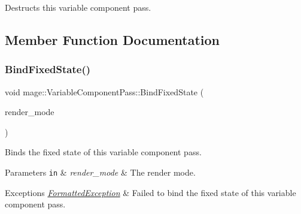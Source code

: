 Destructs this variable component pass. 

\subsection{Member Function Documentation}
\hypertarget{classmage_1_1_variable_component_pass_af020fa18b0df2abe39d953d9e78db37d}{}\label{classmage_1_1_variable_component_pass_af020fa18b0df2abe39d953d9e78db37d} 
\subsubsection{\texorpdfstring{Bind\+Fixed\+State()}{BindFixedState()}}
{\footnotesize\ttfamily void mage\+::\+Variable\+Component\+Pass\+::\+Bind\+Fixed\+State (\begin{DoxyParamCaption}\item[{\hyperlink{namespacemage_a5e7e18b0154373ce8fc942fe3f6b27fd}{Render\+Mode}}]{render\+\_\+mode }\end{DoxyParamCaption})}

Binds the fixed state of this variable component pass.


\begin{DoxyParams}[1]{Parameters}
\mbox{\tt in}  & {\em render\+\_\+mode} & The render mode. \\
\hline
\end{DoxyParams}

\begin{DoxyExceptions}{Exceptions}
{\em \hyperlink{classmage_1_1_formatted_exception}{Formatted\+Exception}} & Failed to bind the fixed state of this variable component pass. \\
\hline
\end{DoxyExceptions}
\hypertarget{classmage_1_1_variable_component_pass_a5aa48514a6f7dc412c4eadb082687d65}{}\label{classmage_1_1_variable_component_pass_a5aa48514a6f7dc412c4eadb082687d65} 
